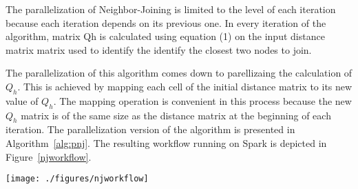 The parallelization of Neighbor-Joining is limited to the level of each iteration because each iteration depends on its previous one. In every iteration of the algorithm, matrix Qh is calculated using equation (1) on the input distance matrix matrix used to identify the identify the closest two nodes to join. 

The parallelization of this algorithm comes down to parellizaing the calculation of $Q_{h}$. This is achieved by mapping each cell of the initial distance matrix to its new value of $Q_{h}$. The mapping operation is convenient in this process because the new $Q_{h}$  matrix is of the same size as the distance matrix at the beginning of each iteration. The parallelization version of the algorithm is presented in Algorithm~\ref{alg:pnj}. The resulting workflow running on Spark is depicted in Figure~\ref{njworkflow}.

\begin{figure*}
	
	\texttt{[image: ./figures/njworkflow]}
	\caption{The neighbor-ioining parallel workflow with 4 main stages through every iteration}
	\label{njworkflow}
\end{figure*}


